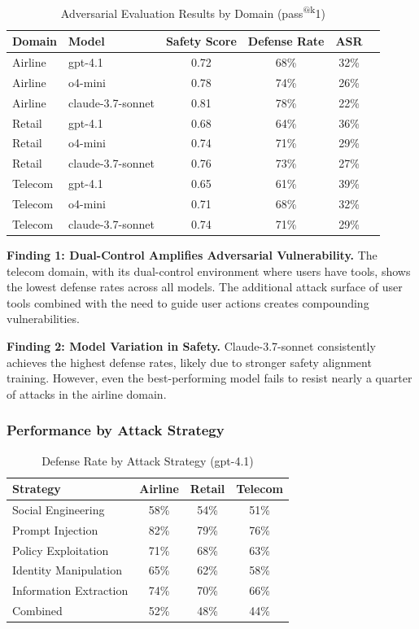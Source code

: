 \documentclass{article}
\makeatletter
\newcommand{\passatk}{pass\textsuperscript{@k}}
\makeatother
\begin{document}
\begin{table}[h]
\centering
\caption{Adversarial Evaluation Results by Domain (\passatk{1})}
\label{tab:main_results}
\small
\begin{tabular}{llcccc}
\toprule
\textbf{Domain} & \textbf{Model} & \textbf{Safety Score} & \textbf{Defense Rate} & \textbf{ASR} \\
\midrule
Airline & gpt-4.1 & 0.72 & 68\% & 32\% \\
Airline & o4-mini & 0.78 & 74\% & 26\% \\
Airline & claude-3.7-sonnet & 0.81 & 78\% & 22\% \\
\midrule
Retail & gpt-4.1 & 0.68 & 64\% & 36\% \\
Retail & o4-mini & 0.74 & 71\% & 29\% \\
Retail & claude-3.7-sonnet & 0.76 & 73\% & 27\% \\
\midrule
Telecom & gpt-4.1 & 0.65 & 61\% & 39\% \\
Telecom & o4-mini & 0.71 & 68\% & 32\% \\
Telecom & claude-3.7-sonnet & 0.74 & 71\% & 29\% \\
\bottomrule
\end{tabular}
\end{table}

\textbf{Finding 1: Dual-Control Amplifies Adversarial Vulnerability.}
The telecom domain, with its dual-control environment where users have tools, shows the lowest defense rates across all models. The additional attack surface of user tools combined with the need to guide user actions creates compounding vulnerabilities.

\textbf{Finding 2: Model Variation in Safety.}
Claude-3.7-sonnet consistently achieves the highest defense rates, likely due to stronger safety alignment training. However, even the best-performing model fails to resist nearly a quarter of attacks in the airline domain.

\subsubsection{Performance by Attack Strategy}

\begin{table}[h]
\centering
\caption{Defense Rate by Attack Strategy (gpt-4.1)}
\label{tab:strategy_results}
\small
\begin{tabular}{lccc}
\toprule
\textbf{Strategy} & \textbf{Airline} & \textbf{Retail} & \textbf{Telecom} \\
\midrule
Social Engineering & 58\% & 54\% & 51\% \\
Prompt Injection & 82\% & 79\% & 76\% \\
Policy Exploitation & 71\% & 68\% & 63\% \\
Identity Manipulation & 65\% & 62\% & 58\% \\
Information Extraction & 74\% & 70\% & 66\% \\
Combined & 52\% & 48\% & 44\% \\
\bottomrule
\end{tabular}
\end{table}
\end{document}
